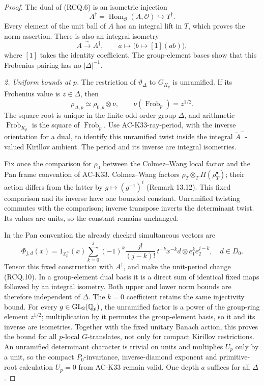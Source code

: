 \begin{proof}
The dual of (RCQ.6) is an isometric injection
\[
 A^\dagger=\operatorname{Hom}_{\mathcal O}(A,\mathcal O)
                   \hookrightarrow T^\dagger .
 \tag{RCQ.8}
\]
Every element of the unit ball of \(A\) has an integral lift in \(T\),
which proves the norm assertion. There is also an integral isometry
\[
 A\xrightarrow{\sim}A^\dagger,\qquad
 a\longmapsto\bigl(b\mapsto[1](ab)\bigr),
 \tag{RCQ.9}
\]
where \([1]\) takes the identity coefficient. The group-element
bases show that this Frobenius pairing has no \(|\Delta|^{-1}\).

\textit{2. Uniform bounds at \(p\).}
The restriction of \(\vartheta_\Delta\) to \(G_{K_p}\) is unramified.
If its Frobenius value is \(z\in\Delta\), then
\[
 \rho_{\Delta,p}\simeq\rho_{0,p}\otimes\nu,\qquad
             \nu(\operatorname{Frob}_p)=z^{1/2}.
 \tag{RCQ.10}
\]
The square root is unique in the finite odd-order group \(\Delta\),
and arithmetic \(\operatorname{Frob}_{K_p}\) is the square of
\(\operatorname{Frob}_p\).
Use AC-K33-ray-period, with the inverse orientation for a dual,
to identify this unramified twist inside the integral
\(\widetilde A^-\)-valued Kirillov ambient. The period and its
inverse are integral isometries.

Fix once the comparison for \(\rho_0\) between the Colmez--Wang
local factor and the Pan frame convention of AC-K33.
Colmez--Wang factors \(\rho_T\otimes_T\Pi(\rho_T^\bullet)\);
their action differs from the latter by
\(g\mapsto(g^{-1})^t\) (Remark 13.12).
This fixed comparison and its inverse have one bounded constant.
Unramified twisting commutes with the comparison; inverse transpose
inverts the determinant twist. Its values are units, so the
constant remains unchanged.

In the Pan convention the already checked simultaneous vectors are
\[
 \Phi_{j,d}(x)=1_{\mathbb Z_p^\times}(x)
       \sum_{k=0}^{j}(-1)^k\frac{j!}{(j-k)!}\,
        t^{-k}x^{-k}d\otimes e_1^k e_2^{j-k},
                     \quad d\in D_0.
 \tag{RCQ.11}
\]
Tensor this fixed construction with \(A^\dagger\), and make the
unit-period change (RCQ.10). In a group-element dual basis it is
a direct sum of identical fixed maps followed by an integral
isometry. Both upper and lower norm bounds are therefore independent
of \(\Delta\). The \(k=0\) coefficient retains the same injectivity
bound. For every \(g\in{\rm GL}_2(\mathbb Q_p)\), the unramified
factor is a power of the group-ring element \(z^{1/2}\); multiplication
by it permutes the group-element basis, so it and its inverse are
isometries. Together with the fixed unitary Banach action, this
proves the bound for all \(p\)-local \(G\)-translates, not only for
compact Kirillov restrictions.
An unramified determinant character is trivial on units and
multiplies \(U_p\) only by a unit, so the compact \(P_0\)-invariance,
inverse-diamond exponent and primitive-root calculation \(U_p=0\)
from AC-K33 remain valid. One depth \(a\) suffices for all \(\Delta\).


\end{proof}
